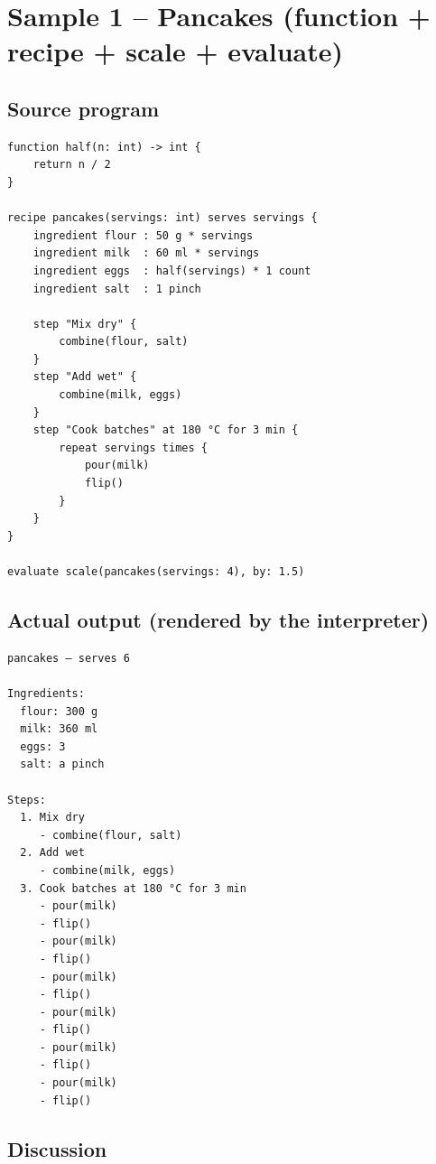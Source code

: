 \documentclass[11pt,a4paper]{article}
\begin{document}
\section{Sample 1 -- Pancakes (function + recipe + scale + evaluate)}

\subsection*{Source program}

\begin{lstlisting}
function half(n: int) -> int {
    return n / 2
}

recipe pancakes(servings: int) serves servings {
    ingredient flour : 50 g * servings
    ingredient milk  : 60 ml * servings
    ingredient eggs  : half(servings) * 1 count
    ingredient salt  : 1 pinch

    step "Mix dry" {
        combine(flour, salt)
    }
    step "Add wet" {
        combine(milk, eggs)
    }
    step "Cook batches" at 180 °C for 3 min {
        repeat servings times {
            pour(milk)
            flip()
        }
    }
}

evaluate scale(pancakes(servings: 4), by: 1.5)
\end{lstlisting}

\subsection*{Actual output (rendered by the interpreter)}

\begin{lstlisting}[style=output]
pancakes — serves 6

Ingredients:
  flour: 300 g
  milk: 360 ml
  eggs: 3
  salt: a pinch

Steps:
  1. Mix dry
     - combine(flour, salt)
  2. Add wet
     - combine(milk, eggs)
  3. Cook batches at 180 °C for 3 min
     - pour(milk)
     - flip()
     - pour(milk)
     - flip()
     - pour(milk)
     - flip()
     - pour(milk)
     - flip()
     - pour(milk)
     - flip()
     - pour(milk)
     - flip()
\end{lstlisting}

\subsection*{Discussion}
\end{document}
